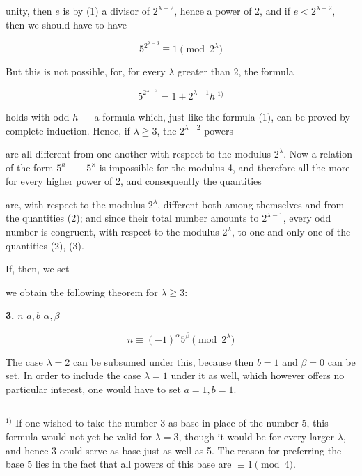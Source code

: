 
unity, then $e$ is by (1) a divisor of $2^{\lambda-2}$, hence a power of 2, and if $e < 2^{\lambda-2}$, then we should have to have

\[
5^{2^{\lambda-3}} \equiv 1 \pmod{2^\lambda}
\]

But this is not possible, for, for every $\lambda$ greater than 2, the formula

\[
5^{2^{\lambda-3}} = 1 + 2^{\lambda-1} h\ ^{1)}
\]

holds with odd $h$ --- a formula which, just like the formula (1), can be proved by complete induction. Hence, if $\lambda \geqq 3$,
the $2^{\lambda-2}$ powers


are all different from one another with respect to the modulus $2^\lambda$. Now a relation of the form $5^h \equiv -5^\varkappa$ is impossible for the modulus 4, and therefore all the more for every higher power of 2, and consequently the quantities


are, with respect to the modulus $2^\lambda$, different both among themselves and from the quantities (2); and since their total number amounts to $2^{\lambda-1}$, every odd number is congruent, with respect to the modulus $2^\lambda$, to one and only one of the quantities (2), (3).

If, then, we set


we obtain the following theorem for $\lambda \geqq 3$:

\noindent\textbf{3.}  $n$  $a, b$ $\alpha, \beta$

\[
n \equiv (-1)^\alpha 5^\beta \pmod{2^\lambda}
\]


The case $\lambda = 2$ can be subsumed under this, because then $b = 1$ and $\beta = 0$ can be set. In order to include the case $\lambda = 1$ under it as well, which however offers no particular interest, one would have to set $a = 1, b = 1$.

\noindent\rule{4cm}{0.4pt}

\noindent $^{1)}$ If one wished to take the number 3 as base in place of the number 5, this formula would not yet be valid for $\lambda = 3$, though it would be for every larger $\lambda$, and hence 3 could serve as base just as well as 5. The reason for preferring the base 5 lies in the fact that all powers of this base are $\equiv 1 \pmod{4}$.
